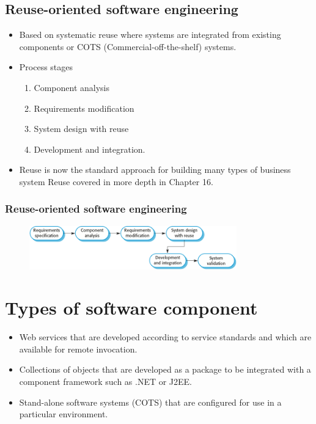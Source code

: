 \subsection{Reuse-oriented software engineering}
\begin{itemize}
  \item Based on systematic reuse where systems are integrated from existing components or COTS (Commercial-off-the-shelf) systems.
  \item Process stages
  \begin{enumerate}
    \item Component analysis
    \item Requirements modification
    \item System design with reuse
    \item Development and integration.
  \end{enumerate}
  \item Reuse is now the standard approach for building many types of business system
  \newline Reuse covered in more depth in Chapter 16.
\end{itemize}



\subsubsection{Reuse-oriented software engineering}
\begin{figure}[h!]
    \centering
    \includegraphics[width = 0.8\textwidth]{./figures/Reuse-oriented_L1_3.png}
    \caption{}
    \label{fig:L1_3}
\end{figure}



\section{Types of software component}
\begin{itemize}

\item Web services that are developed according to service standards and which are available for remote invocation.

\item Collections of objects that are developed as a package to be integrated with a component framework such as .NET or J2EE.

\item Stand-alone software systems (COTS) that are configured for use in a particular environment.
\end{itemize}

